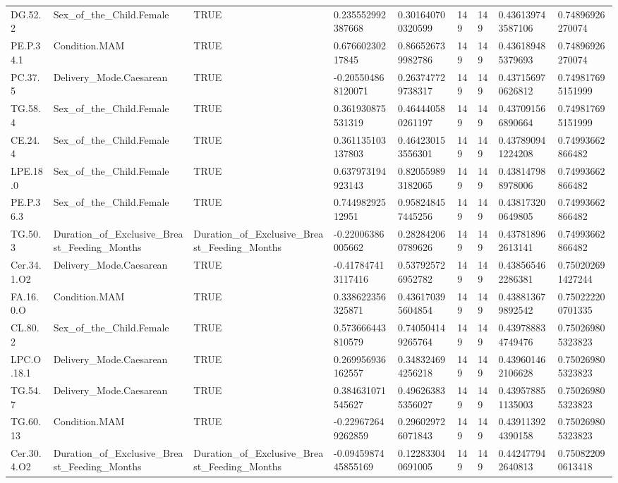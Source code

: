 \begin{longtable}{lllllllll}
DG.52.2 & Sex\_of\_the\_Child.Female & TRUE & 0.235552992387668 & 0.301640700320599 & 149 & 149 & 0.436139743587106 & 0.74896926270074 \\
PE.P.34.1 & Condition.MAM & TRUE & 0.67660230217845 & 0.866526739982786 & 149 & 149 & 0.436189485379693 & 0.74896926270074 \\
PC.37.5 & Delivery\_Mode.Caesarean & TRUE & -0.205504868120071 & 0.263747729738317 & 149 & 149 & 0.437156970626812 & 0.749817695151999 \\
TG.58.4 & Sex\_of\_the\_Child.Female & TRUE & 0.361930875531319 & 0.464440580261197 & 149 & 149 & 0.437091566890664 & 0.749817695151999 \\
CE.24.4 & Sex\_of\_the\_Child.Female & TRUE & 0.361135103137803 & 0.464230153556301 & 149 & 149 & 0.437890941224208 & 0.74993662866482 \\
LPE.18.0 & Sex\_of\_the\_Child.Female & TRUE & 0.637973194923143 & 0.820559893182065 & 149 & 149 & 0.438147988978006 & 0.74993662866482 \\
PE.P.36.3 & Sex\_of\_the\_Child.Female & TRUE & 0.74498292512951 & 0.958248457445256 & 149 & 149 & 0.438173200649805 & 0.74993662866482 \\
TG.50.3 & Duration\_of\_Exclusive\_Breast\_Feeding\_Months & Duration\_of\_Exclusive\_Breast\_Feeding\_Months & -0.22006386005662 & 0.282842060789626 & 149 & 149 & 0.437818962613141 & 0.74993662866482 \\
Cer.34.1.O2 & Delivery\_Mode.Caesarean & TRUE & -0.417847413117416 & 0.537925726952782 & 149 & 149 & 0.438565462286381 & 0.750202691427244 \\
FA.16.0.O & Condition.MAM & TRUE & 0.338622356325871 & 0.436170395604854 & 149 & 149 & 0.438813679892542 & 0.750222200701335 \\
CL.80.2 & Sex\_of\_the\_Child.Female & TRUE & 0.573666443810579 & 0.740504149265764 & 149 & 149 & 0.439788834749476 & 0.750269805323823 \\
LPC.O.18.1 & Delivery\_Mode.Caesarean & TRUE & 0.269956936162557 & 0.348324694256218 & 149 & 149 & 0.439601462106628 & 0.750269805323823 \\
TG.54.7 & Delivery\_Mode.Caesarean & TRUE & 0.384631071545627 & 0.496263835356027 & 149 & 149 & 0.439578851135003 & 0.750269805323823 \\
TG.60.13 & Condition.MAM & TRUE & -0.229672649262859 & 0.296029726071843 & 149 & 149 & 0.439113924390158 & 0.750269805323823 \\
Cer.30.4.O2 & Duration\_of\_Exclusive\_Breast\_Feeding\_Months & Duration\_of\_Exclusive\_Breast\_Feeding\_Months & -0.0945987445855169 & 0.122833040691005 & 149 & 149 & 0.442477942640813 & 0.750822090613418 \\

\end{longtable}
